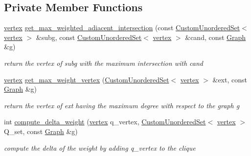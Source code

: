 \subsection*{Private Member Functions}
\begin{DoxyCompactItemize}
\item 
\hyperlink{classTTT__maximal__weighted__clique__fast_a55ca1f8931415f7338827925b86c218d}{vertex} \hyperlink{classTTT__maximal__weighted__clique__fast_ad79a189918a27200d2fbb7c4d99e8603}{get\+\_\+max\+\_\+weighted\+\_\+adiacent\+\_\+intersection} (const \hyperlink{classCustomUnorderedSet}{Custom\+Unordered\+Set}$<$ \hyperlink{classTTT__maximal__weighted__clique__fast_a55ca1f8931415f7338827925b86c218d}{vertex} $>$ \&subg, const \hyperlink{classCustomUnorderedSet}{Custom\+Unordered\+Set}$<$ \hyperlink{classTTT__maximal__weighted__clique__fast_a55ca1f8931415f7338827925b86c218d}{vertex} $>$ \&cand, const \hyperlink{structGraph}{Graph} \&g)
\begin{DoxyCompactList}\small\item\em return the vertex of subg with the maximum intersection with cand \end{DoxyCompactList}\item 
\hyperlink{classTTT__maximal__weighted__clique__fast_a55ca1f8931415f7338827925b86c218d}{vertex} \hyperlink{classTTT__maximal__weighted__clique__fast_a00b40c60402642712549140c217840f2}{get\+\_\+max\+\_\+weight\+\_\+vertex} (\hyperlink{classCustomUnorderedSet}{Custom\+Unordered\+Set}$<$ \hyperlink{classTTT__maximal__weighted__clique__fast_a55ca1f8931415f7338827925b86c218d}{vertex} $>$ \&ext, const \hyperlink{structGraph}{Graph} \&g)
\begin{DoxyCompactList}\small\item\em return the vertex of ext having the maximum degree with respect to the graph g \end{DoxyCompactList}\item 
int \hyperlink{classTTT__maximal__weighted__clique__fast_a19a07874e7cf7bb56bdbab98498a92a8}{compute\+\_\+delta\+\_\+weight} (\hyperlink{classTTT__maximal__weighted__clique__fast_a55ca1f8931415f7338827925b86c218d}{vertex} q\+\_\+vertex, \hyperlink{classCustomUnorderedSet}{Custom\+Unordered\+Set}$<$ \hyperlink{classTTT__maximal__weighted__clique__fast_a55ca1f8931415f7338827925b86c218d}{vertex} $>$ Q\+\_\+set, const \hyperlink{structGraph}{Graph} \&g)
\begin{DoxyCompactList}\small\item\em compute the delta of the weight by adding q\+\_\+vertex to the clique \end{DoxyCompactList}\item 

\end{DoxyCompactItemize}
